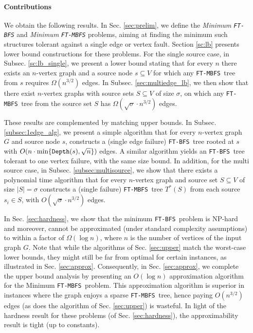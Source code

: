 \documentclass[12pt]{article}
\def\NSource{\sigma}
\def\Depth{\mbox{\tt Depth}}
\def\FTMBFS{\mbox{\tt FT-MBFS}}
\def\FTBFS{\mbox{\tt FT-BFS}}
\begin{document}
\paragraph{Contributions}
We obtain the following results.
In Sec. \ref{sec:prelim}, we define the \emph{Minimum \FTBFS} and
\emph{Minimum \FTMBFS} problems, aiming at finding the minimum such
structures tolerant against a single edge or vertex fault.
Section \ref{sc:lb} presents lower bound constructions for these problems.
For the single source case, in Subsec. \ref{sc:lb_single}, we present a lower bound stating that for every $n$ there exists an $n$-vertex
graph and a source node $s \subseteq V$ for which any
\FTMBFS\ tree from $s$ requires $\Omega(n^{3/2})$ edges.
In Subsec. \ref{sec:multiedge_lb},
we then show that there exist
$n$-vertex graphs with source sets $S \subseteq V$ of size $\NSource$,
on which any \FTMBFS\ tree from the source set $S$ has
$\Omega(\sqrt{\NSource}\cdot n^{3/2})$ edges.

These results are complemented by matching upper bounds.
In Subsec. \ref{subsec:1edge_alg}, we present a simple algorithm that for every
$n$-vertex graph $G$ and source node $s$, constructs a (single edge failure)
\FTBFS\ tree rooted at $s$ with $O(n \cdot \min\{\Depth(s), \sqrt{n}\})$ edges.
A similar algorithm yields an \FTBFS\ tree tolerant to one vertex failure,
with the same size bound.
In addition, for the multi source case, in Subsec. \ref{subsec:multisource}, we show that there exists a polynomial
time algorithm that for every $n$-vertex graph and source set $S \subseteq V$
of size $|S|=\NSource$ constructs  a (single failure) \FTMBFS\ tree $T^*(S)$
from each source $s_i \in S$, with $O(\sqrt{\NSource} \cdot n^{3/2})$ edges.

In Sec. \ref{sec:hardness}, we show that the minimum \FTBFS\ problem is NP-hard and moreover, cannot be approximated
(under standard complexity assumptions) to within a factor of $\Omega(\log n)$,
where $n$ is the number of vertices of the input graph $G$.
Note that while the algorithms of Sec. \ref{sec:upper} match the worst-case lower bounds, they might still be far from optimal for certain instances, as illustrated
in Sec. \ref{sec:approx}.  Consequently, in Sec. \ref{sec:approx}, we complete the upper bound analysis by presenting an $O(\log n)$ approximation algorithm for the Minimum \FTMBFS\ problem.
This approximation algorithm is superior in instances where the graph enjoys
a sparse \FTMBFS\ tree, hence paying $O(n^{3/2})$ edges
(as does the algorithm of Sec. \ref{sec:upper}) is wasteful.
In light of the hardness result for these problems (of Sec. \ref{sec:hardness}),
the approximability result is tight (up to constants).
\end{document}
